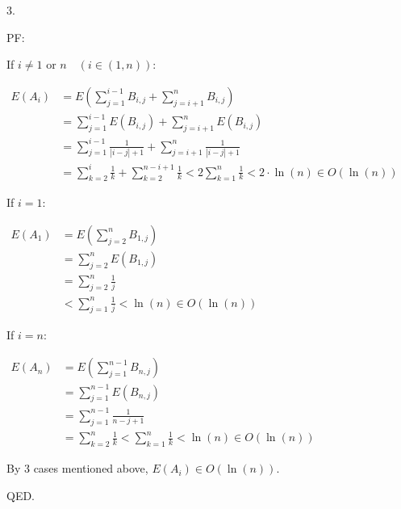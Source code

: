 \documentclass[12pt]{article}
\begin{document}
3.

PF:

If $i \neq 1$ or $n \quad (i \in(1 , n)) $:

$\begin{aligned} E\left(A_i\right)&=E\left(\sum\limits_{j=1}^{i-1} B_{i, j}+\sum\limits_{j=i+1}^n B_{i, j}\right) \\
& =\sum\limits_{j=1}^{i-1} E\left(B_{i, j}\right)+\sum\limits_{j=i+1}^n E\left(B_{i, j}\right) \\
& =\sum\limits_{j=1}^{i-1} \frac{1}{|i-j|+1}+\sum\limits_{j=i +1 }^n \frac{1}{|i-j|+1} \\
& =\sum\limits_{k=2}^i \frac{1}{k}+\sum\limits_{k=2}^{n-i+1} \frac{1}{k}<2 \sum\limits_{k=1}^n \frac{1}{k}<2 \cdot \ln (n) \in O(\ln (n))
\end{aligned} $

If $i=1$:

$\begin{aligned}E(A_1)  &=E\left(\sum\limits_{j=2}^n B_{1, j}\right) \\
&=\sum\limits_{j=2}^n E(B_{1, j}) \\
& =\sum\limits_{j=2}^n \frac{1}{j} \\
& <\sum\limits_{j=1}^n \frac{1}{j}<\ln (n) \in O(\ln (n))
\end{aligned} $

If $i=n$:

$\begin{aligned}E\left(A_n\right)  &=E\left(\sum\limits_{j=1}^{n-1} B_{n, j}\right) \\
& =\sum\limits_{j=1}^{n-1} E\left(B_{n, j}\right) \\
& =\sum\limits_{j=1}^{n-1} \frac{1}{n-j+1} \\
&=\sum\limits_{k=2}^n \frac{1}{k}<\sum\limits_{k=1}^n \frac{1}{k}<\ln (n) \in O(\ln (n))
\end{aligned} $

By 3 cases mentioned above, $E\left(A_i\right) \in O(\ln (n))$.

QED.
\end{document}
